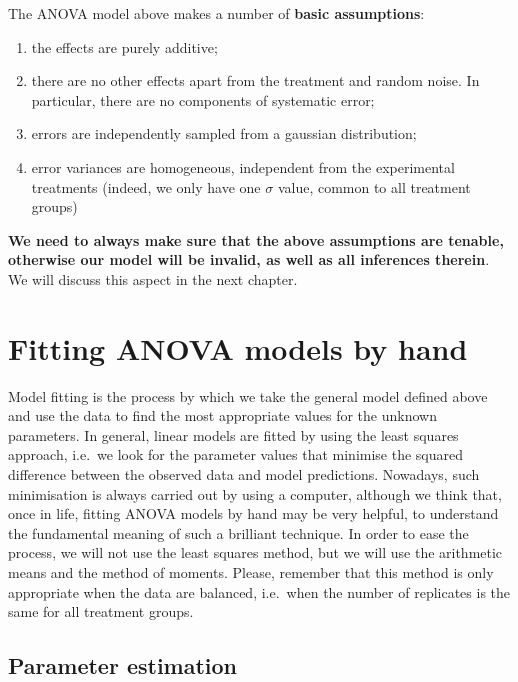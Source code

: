 \documentclass[a4paper,12pt,oneside]{book}
\providecommand{\tightlist}{%
  \setlength{\itemsep}{0pt}\setlength{\parskip}{0pt}}
\begin{document}
The ANOVA model above makes a number of \textbf{basic assumptions}:

\begin{enumerate}
\def\labelenumi{\arabic{enumi}.}
\tightlist
\item
  the effects are purely additive;
\item
  there are no other effects apart from the treatment and random noise. In particular, there are no components of systematic error;
\item
  errors are independently sampled from a gaussian distribution;
\item
  error variances are homogeneous, independent from the experimental treatments (indeed, we only have one \(\sigma\) value, common to all treatment groups)
\end{enumerate}

\textbf{We need to always make sure that the above assumptions are tenable, otherwise our model will be invalid, as well as all inferences therein}. We will discuss this aspect in the next chapter.

\hypertarget{fitting-anova-models-by-hand}{%
\section{Fitting ANOVA models by hand}\label{fitting-anova-models-by-hand}}

Model fitting is the process by which we take the general model defined above and use the data to find the most appropriate values for the unknown parameters. In general, linear models are fitted by using the least squares approach, i.e.~we look for the parameter values that minimise the squared difference between the observed data and model predictions. Nowadays, such minimisation is always carried out by using a computer, although we think that, once in life, fitting ANOVA models by hand may be very helpful, to understand the fundamental meaning of such a brilliant technique. In order to ease the process, we will not use the least squares method, but we will use the arithmetic means and the method of moments. Please, remember that this method is only appropriate when the data are balanced, i.e.~when the number of replicates is the same for all treatment groups.

\hypertarget{parameter-estimation}{%
\subsection{Parameter estimation}\label{parameter-estimation}}
\end{document}
